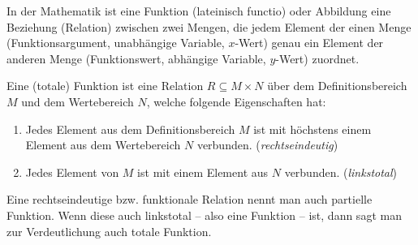 \documentclass{lehramt-informatik-haupt}
\begin{document}
\begin{liExkurs}[Funktion]
In der Mathematik ist eine Funktion (lateinisch functio) oder Abbildung
eine Beziehung (Relation) zwischen zwei Mengen, die jedem Element der
einen Menge (Funktionsargument, unabhängige Variable, $x$-Wert) genau
ein Element der anderen Menge (Funktionswert, abhängige Variable,
$y$-Wert) zuordnet.

Eine (totale) Funktion ist eine Relation $R \subseteq M \times N$ über dem
Deﬁnitionsbereich $M$ und dem Wertebereich $N$, welche folgende
Eigenschaften hat:

\begin{enumerate}
\item Jedes Element aus dem Deﬁnitionsbereich $M$ ist mit höchstens
einem Element aus dem Wertebereich $N$ verbunden. (\emph{rechtseindeutig})

\item Jedes Element von $M$ ist mit einem Element aus $N$ verbunden.
(\emph{linkstotal})
\end{enumerate}
\end{liExkurs}

\begin{liExkurs}
Eine rechtseindeutige bzw. funktionale Relation nennt man auch partielle
Funktion. Wenn diese auch linkstotal – also eine Funktion – ist, dann
sagt man zur Verdeutlichung auch totale Funktion.
\end{liExkurs}
\end{document}
